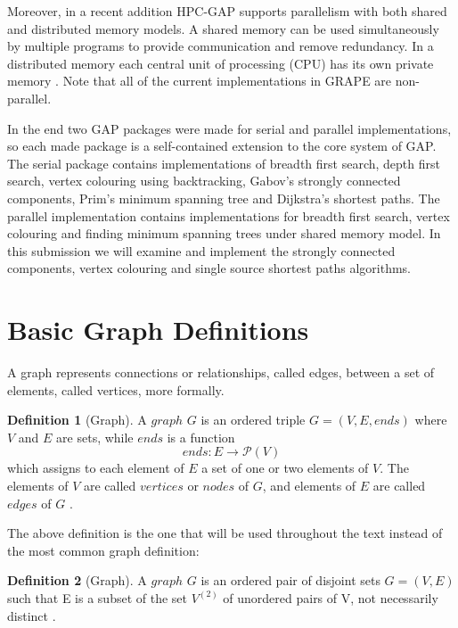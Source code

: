 \documentclass{report}
\theoremstyle{plain}
\theoremstyle{definition}
\newtheorem{definition}{Definition}
\theoremstyle{remark}
\numberwithin{definition}{chapter}
\numberwithin{example}{chapter}
\numberwithin{figure}{chapter}
\numberwithin{theorem}{chapter}
\numberwithin{lemma}{chapter}
\begin{document}
Moreover, in a recent addition HPC-GAP supports parallelism with both shared and distributed memory models. A shared memory can be used simultaneously by multiple programs to provide communication and remove redundancy. In a distributed memory each central unit of processing (CPU) has its own private memory \cite{berman1996fundamentals}. Note that all of the current implementations in GRAPE are non-parallel.

In the end two GAP packages were made for serial and parallel implementations, so each made package is a self-contained extension to the core system of GAP. The serial package contains implementations of breadth first search, depth first search, vertex colouring using backtracking, Gabov's strongly connected components, Prim's minimum spanning tree and Dijkstra's shortest paths. The parallel implementation contains implementations for breadth first search, vertex colouring and finding minimum spanning trees under shared memory model. In this submission we will examine and implement the strongly connected components, vertex colouring and single source shortest paths algorithms.

\section{Basic Graph Definitions}

A graph represents connections or relationships, called edges, between a set of elements, called vertices, more formally.

\begin{definition}[Graph]
A $graph$  $G$ is an ordered triple $G = (V, E, ends)$ where $V$ and $E$ are sets, while $ends$ is a function 
  \begin{equation}
  ends:E\to \mathcal P \left({V}\right)
  \end{equation}
which assigns to each element of $E$ a set of one or two elements of $V$. The elements of $V$ are called $vertices$ or $nodes$ of $G$, and elements of $E$ are called $edges$ of $G$ \cite{bondy2008graph}.
\end{definition}

The above definition is the one that will be used throughout the text instead of the most common graph definition:

\begin{definition}[Graph]
A $graph$  $G$ is an ordered pair of disjoint sets $G = (V, E)$ such that E is a subset of the set $V^{(2)}$ of unordered pairs of V, not necessarily distinct \cite{bollobas1998modern}. 
\end{definition} 
\end{document}

